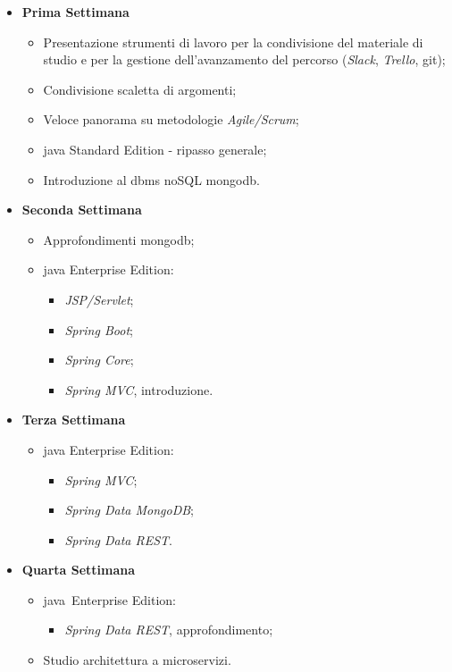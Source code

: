\begin{itemize}
	\item \textbf{Prima Settimana}
	\begin{itemize}
		\item Presentazione strumenti di lavoro per la condivisione del materiale di studio e per la gestione
		dell'avanzamento del percorso (\textit{Slack}, \textit{Trello}, \gls{git}\gloss);
		\item Condivisione scaletta di argomenti;
		\item Veloce panorama su metodologie \textit{Agile/Scrum}; %
		\item \gls{java} Standard Edition - ripasso generale; %
		\item Introduzione al \gls{dbms} noSQL \gls{mongodb}. %
	\end{itemize}

	\clearpage

	\item \textbf{Seconda Settimana}
	\begin{itemize}
		\item Approfondimenti \gls{mongodb}; %
		\item \gls{java} Enterprise Edition:
		\begin{itemize}
			\item \textit{JSP/Servlet}; %
			\item \textit{Spring Boot}; %
			\item \textit{Spring Core}; %
			\item \textit{Spring MVC}, introduzione. %
		\end{itemize}
	\end{itemize}

	\item \textbf{Terza Settimana}
	\begin{itemize}
		\item \gls{java} Enterprise Edition:
		\begin{itemize}
			\item \textit{Spring MVC}; %
			\item \textit{Spring Data MongoDB}; %
			\item \textit{Spring Data REST}. %
		\end{itemize}
	\end{itemize}

	\item \textbf{Quarta Settimana}
	\begin{itemize}
		\item \gls{java}\gloss\ Enterprise Edition:
		\begin{itemize}
			\item \textit{Spring Data REST}, approfondimento; %
		\end{itemize}
		\item Studio architettura a microservizi. %
	\end{itemize}


\end{itemize}
